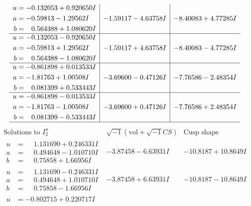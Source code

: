 \documentclass[1p]{elsarticle_modified}
\theoremstyle{definition}
\newcommand{\I}{\sqrt{-1}}
\begin{document}
$$\begin{array}{c|c|c}
\begin{aligned}
u &= -0.132053 + 0.920650 I \\
a &= -0.59813 - 1.29562 I \\
b &= \phantom{-}0.564388 + 1.080620 I\end{aligned}
 & -1.59117 - 4.63758 I & -8.40083 + 4.77285 I \\ \hline\begin{aligned}
u &= -0.132053 - 0.920650 I \\
a &= -0.59813 + 1.29562 I \\
b &= \phantom{-}0.564388 - 1.080620 I\end{aligned}
 & -1.59117 + 4.63758 I & -8.40083 - 4.77285 I \\ \hline\begin{aligned}
u &= -0.861898 + 0.013533 I \\
a &= -1.81763 + 1.00508 I \\
b &= \phantom{-}0.081399 + 0.533443 I\end{aligned}
 & -3.69600 - 0.47126 I & -7.76586 - 2.48354 I \\ \hline\begin{aligned}
u &= -0.861898 - 0.013533 I \\
a &= -1.81763 - 1.00508 I \\
b &= \phantom{-}0.081399 - 0.533443 I\end{aligned}
 & -3.69600 + 0.47126 I & -7.76586 + 2.48354 I\\
 \hline 
 \end{array}$$\newpage$$\begin{array}{c|c|c}  
\text{Solutions to }I^u_{2}& \I (\text{vol} + \sqrt{-1}CS) & \text{Cusp shape}\\
 \hline 
\begin{aligned}
u &= \phantom{-}1.131690 + 0.246331 I \\
a &= \phantom{-}0.494648 - 1.010710 I \\
b &= \phantom{-}0.75858 + 1.66956 I\end{aligned}
 & -3.87458 - 6.63931 I & -10.8187 + 10.8649 I \\ \hline\begin{aligned}
u &= \phantom{-}1.131690 - 0.246331 I \\
a &= \phantom{-}0.494648 + 1.010710 I \\
b &= \phantom{-}0.75858 - 1.66956 I\end{aligned}
 & -3.87458 + 6.63931 I & -10.8187 - 10.8649 I \\ \hline\begin{aligned}
u &= -0.802715 + 0.220717 I \\

\end{aligned}
\end{array}$$
\end{document}
